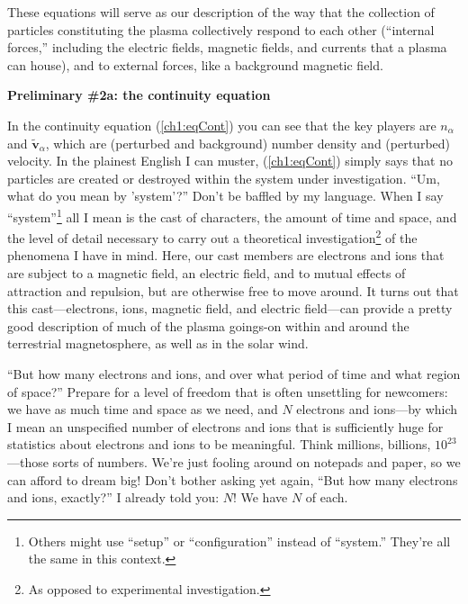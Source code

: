 These equations will serve as our description of the way that the collection of
particles constituting the plasma collectively respond to each other (``internal
forces,'' including the electric fields, magnetic fields, and currents that a
plasma can house), and to external forces, like a background magnetic field.

\textbf{Preliminary \#2a: the continuity equation}

In the continuity equation (\ref{ch1:eqCont}) you can see that the key players
are $n_{\alpha}$ and $\mathbf{\tilde v}_{\alpha}$, which are (perturbed and
background) number density and (perturbed) velocity. In the plainest English I
can muster, (\ref{ch1:eqCont}) simply says that no particles are created or
destroyed within the system under investigation. ``Um, what do you mean by
'system'?'' Don't be baffled by my language. When I say
``system''\footnote{Others might use ``setup'' or ``configuration'' instead of
  ``system.'' They're all the same in this context.} all I mean is the cast of
characters, the amount of time and space, and the level of detail necessary to
carry out a theoretical investigation\footnote{As opposed to experimental
  investigation.} of the phenomena I have in mind. Here, our cast members are
electrons and ions that are subject to a magnetic field, an electric field, and
to mutual effects of attraction and repulsion, but are otherwise free to move
around. It turns out that this cast---electrons, ions, magnetic field, and
electric field---can provide a pretty good description of much of the plasma
goings-on within and around the terrestrial magnetosphere, as well as in the
solar wind.

``But how many electrons and ions, and over what period of time and what region
of space?'' Prepare for a level of freedom that is often unsettling for
newcomers: we have as much time and space as we need, and $N$ electrons and
ions---by which I mean an unspecified number of electrons and ions that is
sufficiently huge for statistics about electrons and ions to be
meaningful. Think millions, billions, $10^{23}$---those sorts of numbers. We're
just fooling around on notepads and paper, so we can afford to dream big! Don't
bother asking yet again, ``But how many electrons and ions, exactly?'' I already
told you: $N$! We have $N$ of each.

